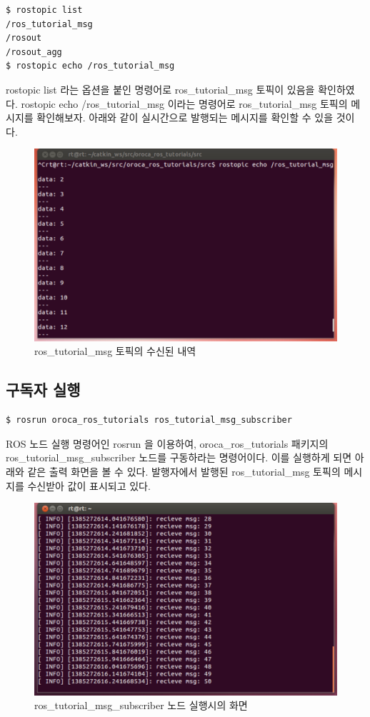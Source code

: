 \begin{lstlisting}[language=ROS]
$ rostopic list
/ros_tutorial_msg
/rosout
/rosout_agg
$ rostopic echo /ros_tutorial_msg
\end{lstlisting}

rostopic list 라는 옵션을 붙인 명령어로 ros\_tutorial\_msg 토픽이 있음을 확인하였다. rostopic echo /ros\_tutorial\_msg 이라는 명령어로 ros\_tutorial\_msg 토픽의 메시지를 확인해보자. 아래와 같이 실시간으로 발행되는 메시지를 확인할 수 있을 것이다.

\begin{figure}[h]
\centering\includegraphics[width=0.5\columnwidth]{pictures/chapter7/rostopic_echo.png}
\caption{ros\_tutorial\_msg 토픽의 수신된 내역}
\end{figure}

\subsection{구독자 실행}

\begin{lstlisting}[language=ROS]
$ rosrun oroca_ros_tutorials ros_tutorial_msg_subscriber 
\end{lstlisting}

ROS 노드 실행 명령어인 rosrun 을 이용하여, oroca\_ros\_tutorials 패키지의 ros\_tutorial\_msg\_subscriber  노드를 구동하라는 명령어이다. 이를 실행하게 되면 아래와 같은 출력 화면을 볼 수 있다. 발행자에서 발행된 ros\_tutorial\_msg 토픽의 메시지를 수신받아 값이 표시되고 있다.

\begin{figure}[h]
\centering\includegraphics[width=0.5\columnwidth]{pictures/chapter7/rosrun_ros_tutorial_msg_subscriber.png}
\caption{ros\_tutorial\_msg\_subscriber 노드 실행시의 화면}
\end{figure}

